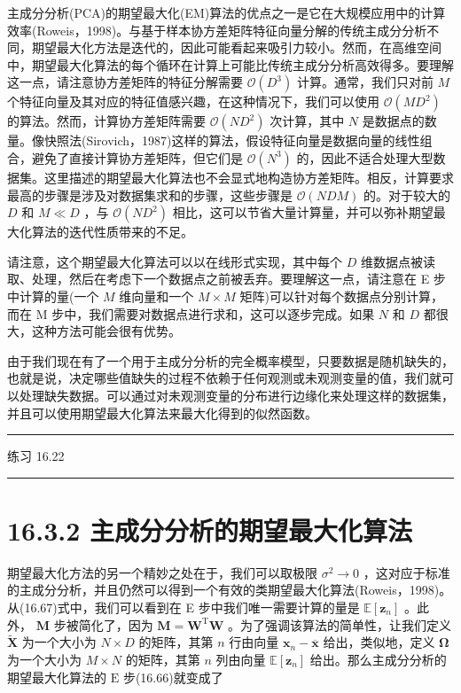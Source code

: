 \documentclass[10pt]{report}
\newcommand{\HRule}{\begin{center}\rule{0.9\linewidth}{0.2mm}\end{center}}
\begin{document}
主成分分析(PCA)的期望最大化(EM)算法的优点之一是它在大规模应用中的计算效率(Roweis，1998)。与基于样本协方差矩阵特征向量分解的传统主成分分析不同，期望最大化方法是迭代的，因此可能看起来吸引力较小。然而，在高维空间中，期望最大化算法的每个循环在计算上可能比传统主成分分析高效得多。要理解这一点，请注意协方差矩阵的特征分解需要 \(\mathcal{O}\left( {D}^{3}\right)\) 计算。通常，我们只对前 \(M\) 个特征向量及其对应的特征值感兴趣，在这种情况下，我们可以使用 \(\mathcal{O}\left( {M{D}^{2}}\right)\) 的算法。然而，计算协方差矩阵需要 \(\mathcal{O}\left( {N{D}^{2}}\right)\) 次计算，其中 \(N\) 是数据点的数量。像快照法(Sirovich，1987)这样的算法，假设特征向量是数据向量的线性组合，避免了直接计算协方差矩阵，但它们是 \(\mathcal{O}\left( {N}^{3}\right)\) 的，因此不适合处理大型数据集。这里描述的期望最大化算法也不会显式地构造协方差矩阵。相反，计算要求最高的步骤是涉及对数据集求和的步骤，这些步骤是 \(\mathcal{O}\left( {NDM}\right)\) 的。对于较大的 \(D\) 和 \(M \ll  D\) ，与 \(\mathcal{O}\left( {N{D}^{2}}\right)\) 相比，这可以节省大量计算量，并可以弥补期望最大化算法的迭代性质带来的不足。

请注意，这个期望最大化算法可以以在线形式实现，其中每个 \(D\) 维数据点被读取、处理，然后在考虑下一个数据点之前被丢弃。要理解这一点，请注意在 E 步中计算的量(一个 \(M\) 维向量和一个 \(M \times  M\) 矩阵)可以针对每个数据点分别计算，而在 M 步中，我们需要对数据点进行求和，这可以逐步完成。如果 \(N\) 和 \(D\) 都很大，这种方法可能会很有优势。

由于我们现在有了一个用于主成分分析的完全概率模型，只要数据是随机缺失的，也就是说，决定哪些值缺失的过程不依赖于任何观测或未观测变量的值，我们就可以处理缺失数据。可以通过对未观测变量的分布进行边缘化来处理这样的数据集，并且可以使用期望最大化算法来最大化得到的似然函数。

\HRule

练习 16.22

\HRule

\section*{16.3.2 主成分分析的期望最大化算法}

期望最大化方法的另一个精妙之处在于，我们可以取极限 \({\sigma }^{2} \rightarrow  0\) ，这对应于标准的主成分分析，并且仍然可以得到一个有效的类期望最大化算法(Roweis，1998)。从(16.67)式中，我们可以看到在 E 步中我们唯一需要计算的量是 \(\mathbb{E}\left\lbrack  {\mathbf{z}}_{n}\right\rbrack\) 。此外， \(\mathbf{M}\) 步被简化了，因为 \(\mathbf{M} = {\mathbf{W}}^{\mathrm{T}}\mathbf{W}\) 。为了强调该算法的简单性，让我们定义 \(\widetilde{\mathbf{X}}\) 为一个大小为 \(N \times  D\) 的矩阵，其第 \(n\) 行由向量 \({\mathbf{x}}_{n} - \overline{\mathbf{x}}\) 给出，类似地，定义 \(\mathbf{\Omega }\) 为一个大小为 \(M \times  N\) 的矩阵，其第 \(n\) 列由向量 \(\mathbb{E}\left\lbrack  {\mathbf{z}}_{n}\right\rbrack\) 给出。那么主成分分析的期望最大化算法的 \(\mathrm{E}\) 步(16.66)就变成了
\end{document}
